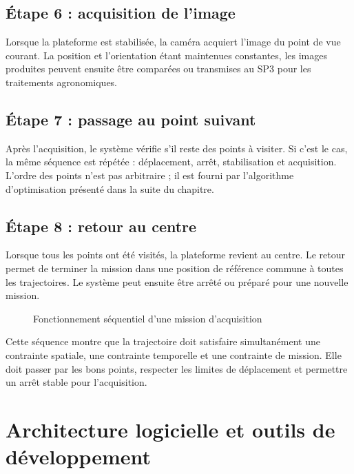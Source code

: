 \subsection{Étape 6 : acquisition de l'image}

Lorsque la plateforme est stabilisée, la caméra acquiert l'image du point de vue courant. La position et l'orientation étant maintenues constantes, les images produites peuvent ensuite être comparées ou transmises au SP3 pour les traitements agronomiques.

\subsection{Étape 7 : passage au point suivant}

Après l'acquisition, le système vérifie s'il reste des points à visiter. Si c'est le cas, la même séquence est répétée : déplacement, arrêt, stabilisation et acquisition. L'ordre des points n'est pas arbitraire ; il est fourni par l'algorithme d'optimisation présenté dans la suite du chapitre.

\subsection{Étape 8 : retour au centre}

Lorsque tous les points ont été visités, la plateforme revient au centre. Le retour permet de terminer la mission dans une position de référence commune à toutes les trajectoires. Le système peut ensuite être arrêté ou préparé pour une nouvelle mission.

\begin{figure}[H]
\centering
{}
\caption{Fonctionnement séquentiel d'une mission d'acquisition}
\label{fig:sequence_mission}
\end{figure}

Cette séquence montre que la trajectoire doit satisfaire simultanément une contrainte spatiale, une contrainte temporelle et une contrainte de mission. Elle doit passer par les bons points, respecter les limites de déplacement et permettre un arrêt stable pour l'acquisition.

\section{Architecture logicielle et outils de développement}
\label{sec:architecture_logicielle}


